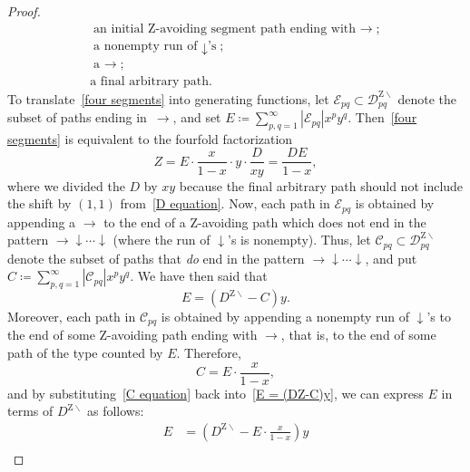 \documentclass[noamsfonts,10pt]{amsart}
\newcommand{\DZ}{\mathcal{D}^{\mathrm{Z} \!\!\!\! \backslash}}
\newcommand{\1}{\mathbf{1}}
\theoremstyle{plain}
\theoremstyle{definition}
\numberwithin{equation}{section}
\begin{document}
\begin{proof}
\begin{equation}
        \label{four segments}
        \begin{array}{l}
        \text{an initial Z-avoiding segment path ending with $\rightarrow$}; \\
        \text{a nonempty run of $\downarrow$'s}; \\
        \text{a $\rightarrow$}; \\
        \text{a final arbitrary path}.
        \end{array}
    \end{equation}
    To translate~\eqref{four segments} into generating functions, let $\mathcal{E}_{pq} \subset \DZ_{pq}$ denote the subset of paths ending in~$\rightarrow$, and set $E \coloneqq \sum_{p,q=1}^\infty \left| \mathcal{E}_{pq} \right| x^p y^q$.
    Then~\eqref{four segments} is equivalent to the fourfold factorization
    \begin{equation}
        \label{Z equation}
        Z = E \cdot \frac{x}{1-x} \cdot y \cdot \frac{D}{xy} = \frac{DE}{1-x},
    \end{equation}
    where we divided the $D$ by $xy$ because the final arbitrary path should not include the shift by $(1,1)$ from~\eqref{D equation}.
    Now, each path in $\mathcal{E}_{pq}$ is obtained by appending a $\rightarrow$ to the end of a Z-avoiding path which does not end in the pattern $\rightarrow \downarrow \cdots \downarrow$ (where the run of $\downarrow$'s is nonempty).
    Thus, let $\mathcal{C}_{pq} \subset \DZ_{pq}$ denote the subset of paths that \emph{do} end in the pattern $\rightarrow \downarrow \cdots \downarrow$, and put $C \coloneqq \sum_{p,q=1}^\infty \left| \mathcal{C}_{pq} \right| x^p y^q$.
    We have then said that
    \begin{equation}
        \label{E = (DZ-C)y}
        E = (D^{\mathrm{Z} \!\!\!\! \backslash}-C)y.
    \end{equation}
    Moreover, each path in $\mathcal{C}_{pq}$ is obtained by appending a nonempty run of $\downarrow$'s to the end of some Z-avoiding path ending with $\rightarrow$, that is, to the end of some path of the type counted by $E$.
    Therefore,
    \begin{equation}
        \label{C equation}
        C = E \cdot \frac{x}{1-x},
    \end{equation}
    and by substituting~\eqref{C equation} back into~\eqref{E = (DZ-C)y}, we can express $E$ in terms of $D^{\mathrm{Z} \!\!\!\! \backslash}$ as follows:
    \begin{align}
        E &= \left(D^{\mathrm{Z} \!\!\!\! \backslash} - E \cdot \frac{x}{1-x} \right)y \nonumber \\

\end{align}
\end{proof}
\end{document}
